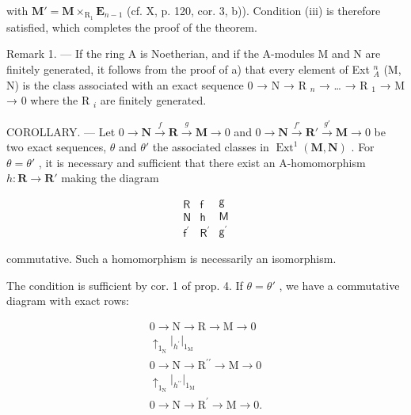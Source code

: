 with \(\mathbf{M}' = \mathbf{M} \times_{\mathrm{R}_{1}} \mathbf{E}_{n-1}\) (cf. X, p. 120, cor. 3, b)). Condition (iii) is therefore satisfied, which completes the proof of the theorem.

Remark 1. --- If the ring A is Noetherian, and if the A-modules M and N are finitely generated, it follows from the proof of a) that every element of Ext \(_{A}^{n}\) (M, N) is the class associated with an exact sequence 0 → N → R \(_{n}\) → \ldots{} → R \(_{1}\) → M → 0 where the R \(_{i}\) are finitely generated.

COROLLARY. --- Let \(0 \to \mathbf{N} \xrightarrow{f} \mathbf{R} \xrightarrow{g} \mathbf{M} \to 0\) and \(0 \to \mathbf{N} \xrightarrow{f'} \mathbf{R}' \xrightarrow{g'} \mathbf{M} \to 0\) be two exact sequences, \(\theta\) and \(\theta'\) the associated classes in \(\operatorname{Ext}^1(\mathbf{M}, \mathbf{N})\) . For \(\theta = \theta'\) , it is necessary and sufficient that there exist an A-homomorphism \(h: \mathbf{R} \to \mathbf{R}'\) making the diagram

\[
\begin{array}{c} \mathsf {R} \\ \mathsf {N} \\ \mathsf {f ^ {\prime}} \end{array} \begin{array}{c} \mathsf {f} \\ \mathsf {h} \\ \mathsf {R ^ {\prime}} \end{array} \begin{array}{c} \mathsf {g} \\ \mathsf {M} \\ \mathsf {g ^ {\prime}} \end{array}
\]

commutative. Such a homomorphism is necessarily an isomorphism.

The condition is sufficient by cor. 1 of prop. 4. If \(\theta = \theta'\) , we have a commutative diagram with exact rows:

\[
\begin{array}{c} 0 \longrightarrow \mathrm{N} \longrightarrow \mathrm{R} \longrightarrow \mathrm{M} \longrightarrow 0 \\ \uparrow_ {1 _ {\mathrm{N}}} \Big | _ {h ^ {\prime}} \Big | _ {1 _ {\mathrm{M}}} \\ 0 \longrightarrow \mathrm{N} \longrightarrow \mathrm{R} ^ {\prime \prime} \longrightarrow \mathrm{M} \longrightarrow 0 \\ \uparrow_ {1 _ {\mathrm{N}}} \Big | _ {h ^ {\prime \prime}} \Big | _ {1 _ {\mathrm{M}}} \\ 0 \longrightarrow \mathrm{N} \longrightarrow \mathrm{R} ^ {\prime} \longrightarrow \mathrm{M} \longrightarrow 0. \end{array}
\]

